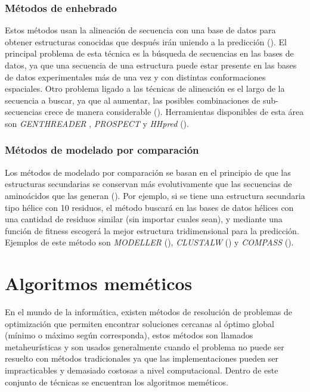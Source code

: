 \subsubsection{Métodos de enhebrado}
Estos métodos usan la alineación de secuencia con una base de datos para obtener estructuras conocidas que después irán uniendo a la predicción (\citealp{floudas:2006}). El principal problema de esta técnica es la búsqueda de secuencias en las bases de datos, ya que una secuencia de una estructura puede estar presente en las bases de datos experimentales más de una vez y con distintas conformaciones espaciales. Otro problema ligado a las técnicas de alineación es el largo de la secuencia a buscar, ya que al aumentar, las posibles combinaciones de sub-secuencias crece de manera considerable (\citealp{lathrop:1994}). Herramientas disponibles de esta área son \textit{GENTHREADER} \citealp{genthreader:1999}, \textit{PROSPECT} \citealp{kim:2003} y \textit{HHpred} (\citealp{soding:2005}).


\subsubsection{Métodos de modelado por comparación}
Los métodos de modelado por comparación se basan en el principio de que las estructuras secundarias se conservan más evolutivamente que las secuencias de aminoácidos que las generan (\citealp{floudas:2006}). Por  ejemplo, si se tiene una estructura secundaria tipo hélice con 10 residuos, el método buscará en las bases de datos hélices con una cantidad de residuos similar (sin importar cuales sean), y mediante una función de fitness escogerá la mejor estructura tridimensional para la predicción. Ejemplos de este método son \textit{MODELLER} (\citealp{eswar:2002}), \textit{CLUSTALW} (\citealp{clustalw}) y \textit{COMPASS} (\citealp{compass}).

\section{Algoritmos meméticos}

En el mundo de la informática, existen métodos de resolución de problemas de optimización que permiten encontrar soluciones cercanas al óptimo global (mínimo o máximo según corresponda), estos métodos son llamados metaheurísticas y son usados generalmente cuando el problema no puede ser resuelto con métodos tradicionales ya que las implementaciones pueden ser impracticables y demasiado costosas a nivel computacional. Dentro de este conjunto de técnicas se encuentran los algoritmos meméticos.

